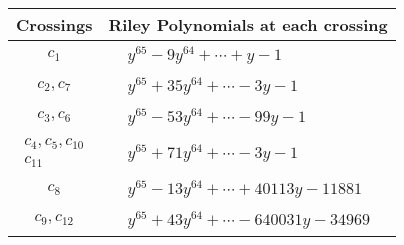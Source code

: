 \documentclass[1p]{elsarticle_modified}
\theoremstyle{definition}
\begin{document}
\begin{tabular}{m{50pt}|m{274pt}}
Crossings & \hspace{64pt}Riley Polynomials at each crossing \\
\hline $$\begin{aligned}c_{1}\end{aligned}$$&$\begin{aligned}
&y^{65}-9 y^{64}+\cdots+y-1
\end{aligned}$\\
\hline $$\begin{aligned}c_{2},c_{7}\end{aligned}$$&$\begin{aligned}
&y^{65}+35 y^{64}+\cdots-3 y-1
\end{aligned}$\\
\hline $$\begin{aligned}c_{3},c_{6}\end{aligned}$$&$\begin{aligned}
&y^{65}-53 y^{64}+\cdots-99 y-1
\end{aligned}$\\
\hline $$\begin{aligned}c_{4},c_{5},c_{10}\\c_{11}\end{aligned}$$&$\begin{aligned}
&y^{65}+71 y^{64}+\cdots-3 y-1
\end{aligned}$\\
\hline $$\begin{aligned}c_{8}\end{aligned}$$&$\begin{aligned}
&y^{65}-13 y^{64}+\cdots+40113 y-11881
\end{aligned}$\\
\hline $$\begin{aligned}c_{9},c_{12}\end{aligned}$$&$\begin{aligned}
&y^{65}+43 y^{64}+\cdots-640031 y-34969
\end{aligned}$\\
\hline
\end{tabular}
\vskip 2pc
\end{document}
